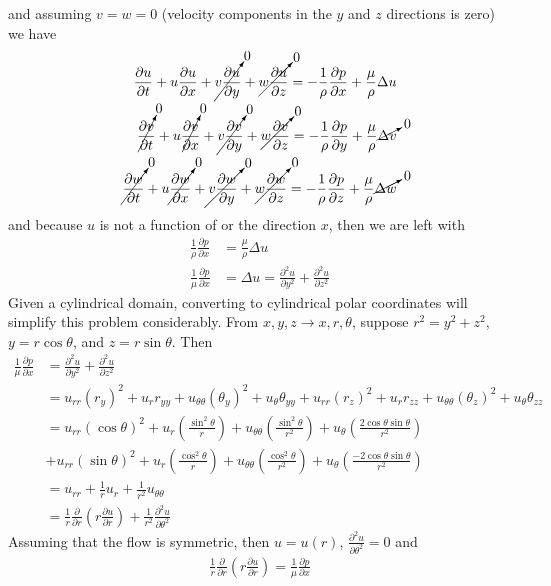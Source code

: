 \documentclass[12pt, a4paper]{article}
\theoremstyle{plain}
\theoremstyle{definition}
\theoremstyle{remark}
\begin{document}
and assuming $v=w=0$ (velocity components in the $y$ and $z$ directions is zero) we have
\begin{align*}
\frac{\partial u}{\partial t} + u \frac{\partial u}{\partial x} + \cancelto{0}{v \frac{\partial u}{\partial y}} + \cancelto{0}{w \frac{\partial u}{\partial z}} = -\frac{1}{\rho} \frac{\partial p}{\partial x} + \frac{\mu}{\rho} \Delta u\\
\cancelto{0}{\frac{\partial v}{\partial t}} + u \cancelto{0}{\frac{\partial v}{\partial x}} + \cancelto{0}{v \frac{\partial v}{\partial y}} + \cancelto{0}{w \frac{\partial v}{\partial z}} = -\frac{1}{\rho} \frac{\partial p}{\partial y} + \frac{\mu}{\rho} \cancelto{0}{\Delta v}\\
\cancelto{0}{\frac{\partial w}{\partial t}} + u \cancelto{0}{\frac{\partial w}{\partial x}} + \cancelto{0}{v \frac{\partial w}{\partial y}} + \cancelto{0}{w \frac{\partial w}{\partial z}} = -\frac{1}{\rho} \frac{\partial p}{\partial z} + \frac{\mu}{\rho}  \cancelto{0}{\Delta w}
\end{align*}
and because $u$ is not a function of or the direction $x$, then we are left with
\begin{align}
\frac{1}{\rho} \frac{\partial p}{\partial x} &= \frac{\mu}{\rho} \Delta u \\
\frac{1}{\mu} \frac{\partial p}{\partial x} &=  \Delta u = \frac{\partial ^2 u}{\partial y^2} + \frac{\partial ^2 u}{\partial z^2}
\end{align}
Given a cylindrical domain, converting to cylindrical polar coordinates will simplify this problem considerably. From $x,y,z \rightarrow x,r,\theta$, suppose $r^2= y^2+z^2$, $y=r\cos\theta$, and $z=r\sin\theta$. Then
\begin{align*}
\frac{1}{\mu} \frac{\partial p}{\partial x} &= \frac{\partial ^2 u}{\partial y^2} + \frac{\partial ^2 u}{\partial z^2} \\
&=u_{rr}(r_y)^2+u_rr_{yy}+u_{\theta\theta}(\theta_y)^2 + u_\theta \theta_{yy} + u_{rr}(r_z)^2+u_rr_{zz}+u_{\theta\theta}(\theta_z)^2 + u_\theta \theta_{zz} \\
&=u_{rr}(\cos\theta)^2+u_r \left(\frac{\sin^2\theta}{r}\right)+u_{\theta\theta}\left(\frac{\sin^2\theta}{r^2}\right) + u_\theta \left( \frac{2\cos\theta\sin\theta}{r^2}  \right) \\
&+ u_{rr}(\sin\theta)^2+u_r \left(\frac{\cos^2\theta}{r}\right)+u_{\theta\theta}\left(\frac{\cos^2\theta}{r^2}\right) + u_\theta \left( \frac{-2\cos\theta\sin\theta}{r^2}  \right) \\
&= u_{rr} + \frac{1}{r} u_r + \frac{1}{r^2} u_{\theta\theta} \\
&= \frac{1}{r}\frac{\partial}{\partial r}\left( r\frac{\partial u}{\partial r} \right) + \frac{1}{r^2} \frac{\partial^2 u}{\partial \theta^2}
\end{align*} 
Assuming that the flow is symmetric, then $u=u(r)$, $\frac{\partial^2 u}{\partial \theta^2}=0$ and
\begin{align}
\frac{1}{r}\frac{\partial}{\partial r}\left( r\frac{\partial u}{\partial r} \right) = \frac{1}{\mu} \frac{\partial p}{\partial x}
\end{align}
\end{document}
